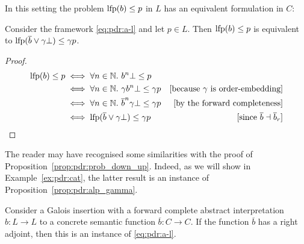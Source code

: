 In this setting the problem $\text{lfp} (b) \le p$ in $L$ has an equivalent formulation in  $C$:
\begin{prop}\label{prop:pdr:alp_gamma}
	Consider the framework \eqref{eq:pdr:a-l} and let $p \in L$.
	Then $\text{lfp}(b) \le p$ is equivalent to $\text{lfp}(\overline{b} \lor \gamma \bot) \le \gamma p$.
\end{prop}
\begin{proof}
	\begin{align*}
		\text{lfp}(b) \le p
		 & \iff \forall n \in \mathbb{N}.~b^n \bot \le p                                                                              \\
		 & \iff \forall n \in \mathbb{N}.~\gamma b^n \bot \le \gamma p            & [\text{because $\gamma$ is order-embedding}]      \\
		 & \iff \forall n \in \mathbb{N}.~\overline{b}^n \gamma \bot \le \gamma p & [\text{by the forward completeness}]              \\
		 & \iff \text{lfp}(\overline{b} \lor  \gamma \bot) \le \gamma p                 & [\text{since }\overline{b} \dashv \overline{b}_r]
	\end{align*}
\end{proof}
The reader may have recognised some similarities with the proof of Proposition~\ref{prop:pdr:prob_down_up}. Indeed, as we will show in Example~\ref{ex:pdr:cat}, the latter result is an instance of Proposition~\ref{prop:pdr:alp_gamma}.

\begin{example}
	Consider a Galois insertion with a forward complete abstract interpretation $b\colon L \to L$ to a concrete semantic function $\overline{b}\colon C \to C$. If the function $\overline{b}$ has a right adjoint, then this is an instance of \eqref{eq:pdr:a-l}.
\end{example}

